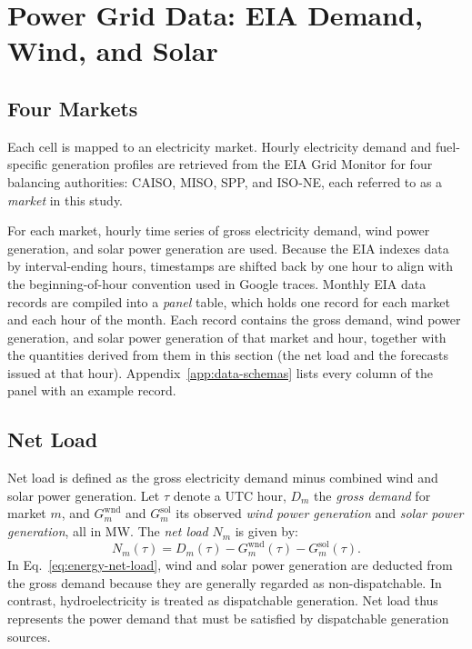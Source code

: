 \documentclass{UNCC-thesis}
\begin{document}
\section{Power Grid Data: EIA Demand, Wind, and Solar}
\label{sec:energy-data}

\subsection{Four Markets}
\label{subsec:energy-sources}

Each cell is mapped to an electricity market. Hourly electricity demand and fuel-specific
generation profiles are retrieved from the EIA Grid Monitor \cite{eiaGridMonitor}
for four balancing authorities: CAISO, MISO, SPP, and ISO-NE, each
referred to as a \emph{market} in this study.

For each market, hourly time series of gross electricity demand, wind power
generation, and solar power generation are used. Because the EIA indexes data by
interval-ending hours, timestamps are shifted back by one hour to align with the
beginning-of-hour convention used in Google traces. Monthly
EIA data records are compiled into a \emph{panel} table, which holds one record for each
market and each hour of the month. Each record contains the gross demand, wind power
generation, and solar power generation of that market and hour, together with the quantities
derived from them in this section (the net load and the forecasts issued at that hour).
Appendix~\ref{app:data-schemas} lists every column of the panel with an example record.

\subsection{Net Load}
\label{subsec:energy-net-load}

Net load is defined as the gross electricity demand minus combined wind and
solar power generation. Let \(\tau\) denote a UTC hour, \(D_m\) the
\emph{gross demand} for market \(m\), and \(G^{\mathrm{wnd}}_m\) and
\(G^{\mathrm{sol}}_m\) its observed \emph{wind power generation} and
\emph{solar power generation}, all in MW. The \emph{net load} \(N_m\) is given by:
\begin{equation}
  N_m(\tau)
  =
  D_m(\tau)
  -G^{\mathrm{wnd}}_m(\tau)
  -G^{\mathrm{sol}}_m(\tau).
  \label{eq:energy-net-load}
\end{equation}
In Eq.~\eqref{eq:energy-net-load}, wind and solar power generation are deducted
from the gross demand because they are generally regarded as non-dispatchable.
In contrast, hydroelectricity is treated as dispatchable generation. Net load
thus represents the power demand that must be satisfied by dispatchable
generation sources.
\end{document}
